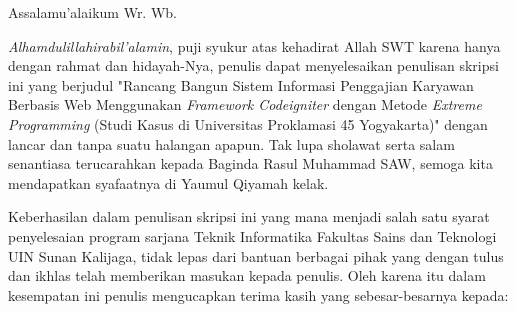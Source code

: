 \documentclass{jtetiskripsi}
\begin{document}
\cover

\clearpage
{}
{}
\approvalpage

\acc

\authenticity

\preface
Assalamu'alaikum Wr. Wb.

\vspace{0.5cm}

\emph{Alhamdulillahirabil'alamin}, puji syukur atas kehadirat Allah SWT karena hanya dengan rahmat dan hidayah-Nya, penulis dapat menyelesaikan penulisan skripsi ini yang berjudul "Rancang Bangun Sistem Informasi Penggajian Karyawan Berbasis Web Menggunakan \emph{Framework Codeigniter} dengan Metode \emph{Extreme Programming} (Studi Kasus di Universitas Proklamasi 45 Yogyakarta)" dengan lancar dan tanpa suatu halangan apapun. Tak lupa sholawat serta salam senantiasa terucarahkan kepada Baginda Rasul Muhammad SAW, semoga kita mendapatkan syafaatnya di Yaumul Qiyamah kelak.

Keberhasilan dalam penulisan skripsi ini yang mana menjadi salah satu syarat penyelesaian program sarjana Teknik Informatika Fakultas Sains dan Teknologi UIN Sunan Kalijaga, tidak lepas dari bantuan berbagai pihak yang dengan tulus dan ikhlas telah memberikan masukan kepada penulis. Oleh karena itu dalam kesempatan ini penulis mengucapkan terima kasih yang sebesar-besarnya kepada:
\end{document}
